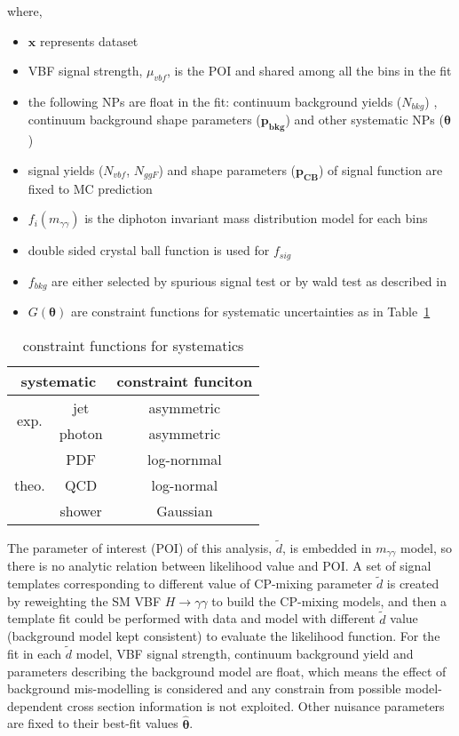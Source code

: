 where,
\begin{itemize}
	\item $\boldsymbol x$ represents dataset
	\item VBF signal strength, $\mu_{vbf}$, is the POI and shared among all the bins in the fit
	\item the following NPs are float in the fit: continuum background yields ($N_{bkg}$) , continuum background shape parameters ($\boldsymbol{p_{bkg}}$) and other systematic NPs ($\boldsymbol{\theta}$)
	\item signal yields ($N_{vbf}$, $N_{ggF}$) and shape parameters ($\boldsymbol{p_{CB}}$) of signal function are fixed to MC prediction
	\item $f_{i}(m_{\gamma\gamma})$ is the diphoton invariant mass distribution model for each bins
	\item double sided crystal ball function is used for $f_{sig}$
	\item $f_{bkg}$ are either selected by spurious signal test or by wald test as described in \Sect{\ref{sec:background_model}}
	\item $G(\boldsymbol \theta)$ are constraint functions for systematic uncertainties as in Table~\ref{tab:constraint_func}
\end{itemize}

\begin{table}[]
	\centering
\begin{tabular}{ccc}
	\hline
	\toprule
	\multicolumn{2}{c}{systematic} & constraint funciton \\ \hline
	\toprule
	\multirow{2}{*}{exp.}  & jet    & asymmetric                \\ \cline{2-3} 
	& photon & asymmetric                \\ \hline
	\multirow{3}{*}{theo.} & PDF    & log-nornmal                \\ \cline{2-3} 
	& QCD    & log-normal                \\ \cline{2-3} 
	& shower & Gaussian                \\ \bottomrule
\end{tabular}
\caption{constraint functions for systematics}
\label{tab:constraint_func}
\end{table}

The parameter of interest (POI) of this analysis, $\tilde{d}$, is embedded in $m_{\gamma\gamma}$ model, so there is no analytic relation between likelihood value and POI. A set of signal templates corresponding to different value of CP-mixing parameter $\tilde{d}$ is created by reweighting the SM VBF $H\to\gamma\gamma$ to build the CP-mixing models, and then a template fit could be performed with data and model with different $\tilde{d}$ value (background model kept consistent) to evaluate the likelihood function. For the fit in each $\tilde{d}$ model, VBF signal strength, continuum background yield and parameters describing the background model are float, which means the effect of background mis-modelling is considered and any constrain from possible model-dependent cross section information is not exploited. Other nuisance parameters are fixed to their best-fit values $\hat{\boldsymbol \theta}$. 


